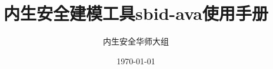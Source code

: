 \documentclass[UTF8,a4paper,12pt,oneside]{book}
\begin{document}
\title{\heiti 内生安全建模工具sbid-ava使用手册}
\author{\kaishu 内生安全华师大组}
\date{\today}

\frontmatter
\maketitle
\tableofcontents

\mainmatter







\backmatter
\end{document}
